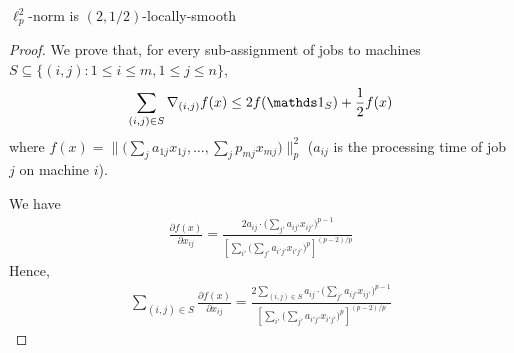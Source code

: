 \begin{lemma}
$\ell_{p}^{2}$-norm is $(2,1/2)$-locally-smooth
\end{lemma}
%
\begin{proof}
We prove that, for every sub-assignment of jobs to machines $S \subseteq \{(i,j): 1 \leq i \leq m, 1 \leq j \leq n\}$,
%
\begin{align}	\label{ineq:lp-smooth}
\sum_{(i,j) \in S} \nabla_{(i,j)} f(x) \leq 2 f(\one_{S}) + \frac{1}{2} f(x)
\end{align}
where $f(x) = \| \bigl( \sum_{j} a_{1j} x_{1j}, \ldots, \sum_{j} p_{mj} x_{mj} \bigr)\|_{p}^{2}$
($a_{ij}$ is the processing time of job $j$ on machine $i$).


We have
%
\begin{align*}
\frac{\partial f(x)}{\partial x_{ij}}
= \frac{2a_{ij} \cdot \bigl( \sum_{j'} a_{ij'} x_{ij'} \bigr)^{p-1} }{ \left[ \sum_{i'} \bigl( \sum_{j'} a_{i'j'} x_{i'j'} \bigr)^{p} \right]^{(p-2)/p}}
\end{align*}
Hence,
\begin{align*}
\sum_{(i,j) \in S} \frac{\partial f(x)}{\partial x_{ij}}
= \frac{ 2 \sum_{(i,j) \in S} a_{ij} \cdot \bigl( \sum_{j'} a_{ij'} x_{ij'} \bigr)^{p-1} }{ \left[ \sum_{i'} \bigl( \sum_{j'} a_{i'j'} x_{i'j'} \bigr)^{p} \right]^{(p-2)/p}}
\end{align*}


\end{proof}
